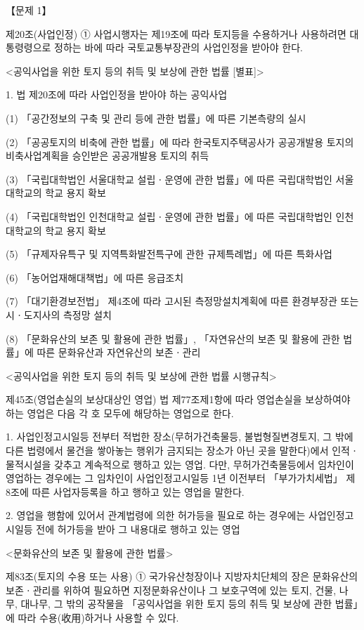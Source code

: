 \begin{longquestion}{【문제 1】}
\begin{framedtext}
제20조(사업인정) ① 사업시행자는 제19조에 따라 토지등을 수용하거나 사용하려면 대통령령으로 정하는 바에 따라 국토교통부장관의 사업인정을 받아야 한다. \par
<공익사업을 위한 토지 등의 취득 및 보상에 관한 법률 [별표]> \par
1. 법 제20조에 따라 사업인정을 받아야 하는 공익사업 \par
\medskip\noindent (1) 「공간정보의 구축 및 관리 등에 관한 법률」에 따른 기본측량의 실시 \par
\medskip\noindent (2) 「공공토지의 비축에 관한 법률」에 따라 한국토지주택공사가 공공개발용 토지의 비축사업계획을 승인받은 공공개발용 토지의 취득 \par
\medskip\noindent (3) 「국립대학법인 서울대학교 설립ㆍ운영에 관한 법률」에 따른 국립대학법인 서울대학교의 학교 용지 확보 \par
\medskip\noindent (4) 「국립대학법인 인천대학교 설립ㆍ운영에 관한 법률」에 따른 국립대학법인 인천대학교의 학교 용지 확보 \par
\medskip\noindent (5) 「규제자유특구 및 지역특화발전특구에 관한 규제특례법」에 따른 특화사업 \par
\medskip\noindent (6) 「농어업재해대책법」에 따른 응급조치 \par
\medskip\noindent (7) 「대기환경보전법」 제4조에 따라 고시된 측정망설치계획에 따른 환경부장관 또는 시ㆍ도지사의 측정망 설치 \par
\medskip\noindent (8) 「문화유산의 보존 및 활용에 관한 법률」, 「자연유산의 보존 및 활용에 관한 법률」에 따른 문화유산과 자연유산의 보존ㆍ관리 \par
<공익사업을 위한 토지 등의 취득 및 보상에 관한 법률 시행규칙> \par
제45조(영업손실의 보상대상인 영업) 법 제77조제1항에 따라 영업손실을 보상하여야 하는 영업은 다음 각 호 모두에 해당하는 영업으로 한다. \par
1. 사업인정고시일등 전부터 적법한 장소(무허가건축물등, 불법형질변경토지, 그 밖에 다른 법령에서 물건을 쌓아놓는 행위가 금지되는 장소가 아닌 곳을 말한다)에서 인적ㆍ물적시설을 갖추고 계속적으로 행하고 있는 영업. 다만, 무허가건축물등에서 임차인이 영업하는 경우에는 그 임차인이 사업인정고시일등 1년 이전부터 「부가가치세법」 제8조에 따른 사업자등록을 하고 행하고 있는 영업을 말한다. \par
2. 영업을 행함에 있어서 관계법령에 의한 허가등을 필요로 하는 경우에는 사업인정고시일등 전에 허가등을 받아 그 내용대로 행하고 있는 영업 \par
<문화유산의 보존 및 활용에 관한 법률> \par
제83조(토지의 수용 또는 사용) ① 국가유산청장이나 지방자치단체의 장은 문화유산의 보존ㆍ관리를 위하여 필요하면 지정문화유산이나 그 보호구역에 있는 토지, 건물, 나무, 대나무, 그 밖의 공작물을 「공익사업을 위한 토지 등의 취득 및 보상에 관한 법률」에 따라 수용(收用)하거나 사용할 수 있다. \par
\end{framedtext}
\end{longquestion}
